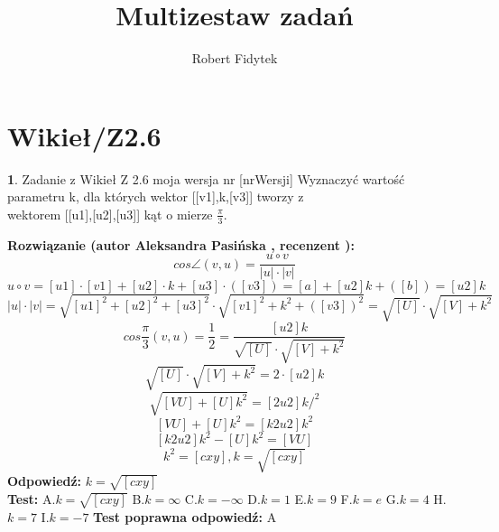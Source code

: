 \documentclass[12pt, a4paper]{article}
\title{Multizestaw zadań}
\author{Robert Fidytek}
\date{}
\theoremstyle{definition} %
\newtheorem{zad}{}
\newcommand{\kategoria}[1]{\section{#1}} %
\newcommand{\zadStart}[1]{\begin{zad}#1\newline} %
\newcommand{\zadStop}{\end{zad}}   %
\newcommand{\rozwStart}[2]{\noindent \textbf{Rozwiązanie (autor #1 , recenzent #2): }\newline} %
\newcommand{\rozwStop}{\newline}                                            %
\newcommand{\odpStart}{\noindent \textbf{Odpowiedź:}\newline}    %
\newcommand{\odpStop}{\newline}                                             %
\newcommand{\testStart}{\noindent \textbf{Test:}\newline} %
\newcommand{\testStop}{\newline} %
\newcommand{\kluczStart}{\noindent \textbf{Test poprawna odpowiedź:}\newline} %
\newcommand{\kluczStop}{\newline} %
\begin{document}
\maketitle


\kategoria{Wikieł/Z2.6}
\zadStart{Zadanie z Wikieł Z 2.6 moja wersja nr [nrWersji]}
Wyznaczyć wartość parametru k, dla których wektor [[v1],k,[v3]] tworzy z \\ wektorem [[u1],[u2],[u3]] kąt o mierze $\frac{\pi}{3}$.
\zadStop
\rozwStart{Aleksandra Pasińska}{}
$$cos\angle(v,u)=\frac{u\circ v}{|u|\cdot |v|}$$
$$u\circ v=[u1]\cdot [v1]+[u2]\cdot k+[u3]\cdot ([v3])=[a]+[u2]k+([b])=[u2]k$$
$$|u|\cdot |v|=\sqrt{[u1]^2+[u2]^2+[u3]^2}\cdot \sqrt{[v1]^2+k^2+([v3])^2}=\sqrt{[U]}\cdot\sqrt{[V]+k^2}$$
$$cos\frac{\pi}{3}(v,u)=\frac{1}{2}=\frac{[u2]k}{\sqrt{[U]}\cdot\sqrt{[V]+k^2}}$$
$$\sqrt{[U]}\cdot\sqrt{[V]+k^2}=2\cdot[u2]k$$
$$\sqrt{[VU]+[U]k^2}=[2u2]k \bigg/^2$$
$$[VU]+[U]k^2=[k2u2]k^2$$
$$[k2u2]k^2-[U]k^2=[VU]$$
$$k^2=[cxy],k=\sqrt{[cxy]}$$
\rozwStop
\odpStart
$k=\sqrt{[cxy]}$\\
\odpStop
\testStart
A.$k=\sqrt{[cxy]}$
B.$k=\infty$
C.$k=-\infty$
D.$k=1$
E.$k=9$
F.$k=e$
G.$k=4$
H.$k=7$
I.$k=-7$
\testStop
\kluczStart
A
\kluczStop
\end{document}

